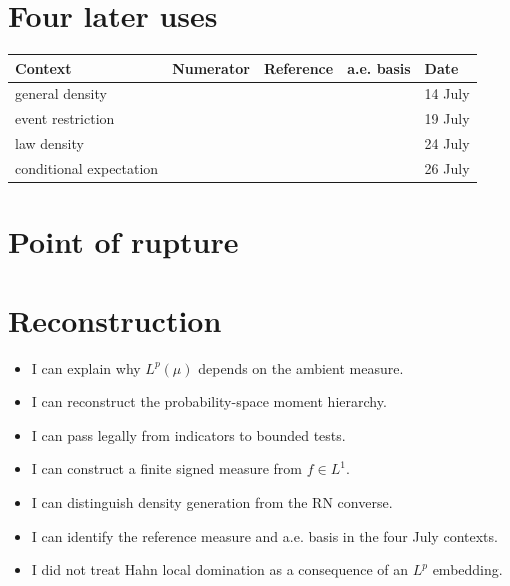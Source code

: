 \section*{Four later uses}

\begin{center}
\begin{tabular}{p{30mm}p{35mm}p{35mm}p{32mm}p{22mm}}
\textbf{Context} & \textbf{Numerator} & \textbf{Reference} & \textbf{a.e. basis} & \textbf{Date}\\
\hline
general density & & & & 14 July\\[1.6em]
event restriction & & & & 19 July\\[1.6em]
law density & & & & 24 July\\[1.6em]
conditional expectation & & & & 26 July
\end{tabular}
\end{center}

\section*{Point of rupture}

\section*{Reconstruction}

\begin{itemize}
  \item[$\square$] I can explain why $L^p(\mu)$ depends on the ambient measure.
  \item[$\square$] I can reconstruct the probability-space moment hierarchy.
  \item[$\square$] I can pass legally from indicators to bounded tests.
  \item[$\square$] I can construct a finite signed measure from $f\in L^1$.
  \item[$\square$] I can distinguish density generation from the RN converse.
  \item[$\square$] I can identify the reference measure and a.e. basis in the four July contexts.
  \item[$\square$] I did not treat Hahn local domination as a consequence of an $L^p$ embedding.
\end{itemize}

